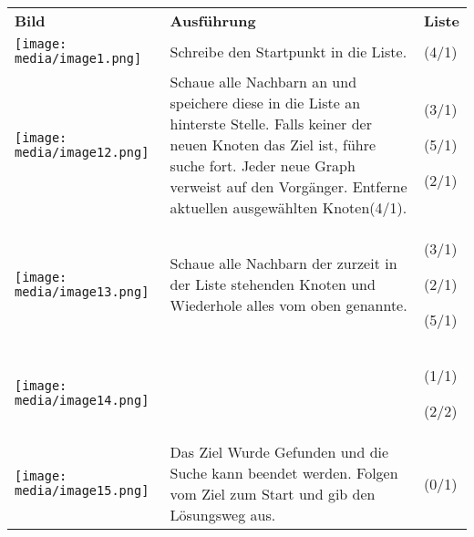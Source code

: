 \begin{longtable}[]{@{}lll@{}}
\toprule
\endhead
\textbf{Bild} & \textbf{Ausführung} & \textbf{Liste}\tabularnewline
\texttt{[image: media/image1.png]} &
Schreibe den Startpunkt in die Liste. & (4/1)\tabularnewline
\begin{minipage}[t]{0.30\columnwidth}\raggedright
\texttt{[image: media/image12.png]}\strut
\end{minipage} & \begin{minipage}[t]{0.30\columnwidth}\raggedright
Schaue alle Nachbarn an und speichere diese in die Liste an hinterste
Stelle. Falls keiner der neuen Knoten das Ziel ist, führe suche fort.
Jeder neue Graph verweist auf den Vorgänger. Entferne aktuellen
ausgewählten Knoten(4/1).\strut
\end{minipage} & \begin{minipage}[t]{0.30\columnwidth}\raggedright
(3/1)

(5/1)

(2/1)\strut
\end{minipage}\tabularnewline
\begin{minipage}[t]{0.30\columnwidth}\raggedright
\texttt{[image: media/image13.png]}\strut
\end{minipage} & \begin{minipage}[t]{0.30\columnwidth}\raggedright
Schaue alle Nachbarn der zurzeit in der Liste stehenden Knoten und
Wiederhole alles vom oben genannte.\strut
\end{minipage} & \begin{minipage}[t]{0.30\columnwidth}\raggedright
(3/1)

(2/1)

(5/1)\strut
\end{minipage}\tabularnewline
\begin{minipage}[t]{0.30\columnwidth}\raggedright
\texttt{[image: media/image14.png]}\strut
\end{minipage} & \begin{minipage}[t]{0.30\columnwidth}\raggedright
\strut
\end{minipage} & \begin{minipage}[t]{0.30\columnwidth}\raggedright
(1/1)

(2/2)\strut
\end{minipage}\tabularnewline
\begin{minipage}[t]{0.30\columnwidth}\raggedright
\texttt{[image: media/image15.png]}\strut
\end{minipage} & \begin{minipage}[t]{0.30\columnwidth}\raggedright
Das Ziel Wurde Gefunden und die Suche kann beendet werden. Folgen vom
Ziel zum Start und gib den Lösungsweg aus.\strut
\end{minipage} & \begin{minipage}[t]{0.30\columnwidth}\raggedright
(0/1)


\end{minipage}
\end{longtable}
